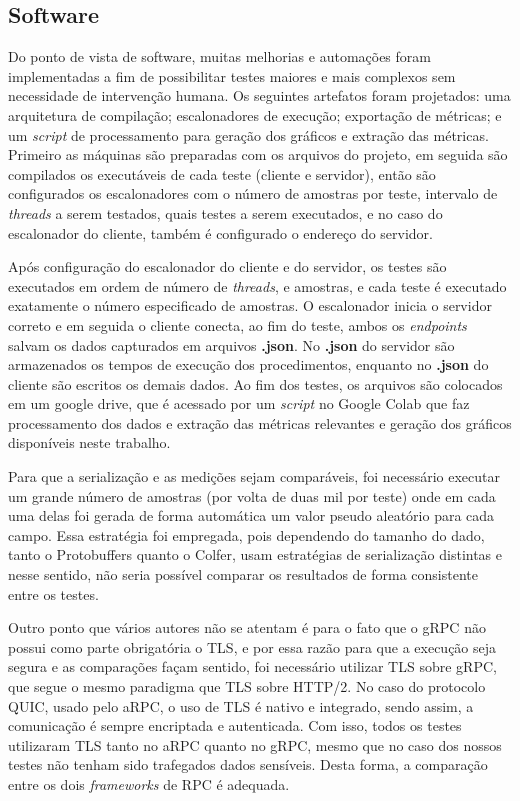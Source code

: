 \subsection{Software}
\label{sec:infraestrutura_execucao_software}

Do ponto de vista de software, muitas melhorias e automações foram implementadas a fim de possibilitar testes maiores e mais complexos sem necessidade de intervenção humana. Os seguintes artefatos foram projetados: uma arquitetura de compilação; escalonadores de execução; exportação de métricas; e um \textit{script} de processamento para geração dos gráficos e extração das métricas. Primeiro as máquinas são preparadas com os arquivos do projeto, em seguida são compilados os executáveis de cada teste (cliente e servidor), então são configurados os escalonadores com o número de amostras por teste, intervalo de \textit{threads} a serem testados, quais testes a serem executados, e no caso do escalonador do cliente, também é configurado o endereço do servidor. 

Após configuração do escalonador do cliente e do servidor, os testes são executados em ordem de número de \textit{threads}, e amostras, e cada teste é executado exatamente o número especificado de amostras. O escalonador inicia o servidor correto e em seguida o cliente conecta, ao fim do teste, ambos os \textit{endpoints} salvam os dados capturados em arquivos \textbf{.json}. No \textbf{.json} do servidor são armazenados os tempos de execução dos procedimentos, enquanto no \textbf{.json} do cliente são escritos os demais dados. Ao fim dos testes, os arquivos são colocados em um google drive, que é acessado por um \textit{script} no Google Colab que faz processamento dos dados e extração das métricas relevantes e geração dos gráficos disponíveis neste trabalho.

Para que a serialização e as medições sejam comparáveis, foi necessário executar um grande número de amostras (por volta de duas mil por teste) onde em cada uma delas foi gerada de forma automática um valor pseudo aleatório para cada campo. Essa estratégia foi empregada, pois dependendo do tamanho do dado, tanto o Protobuffers quanto o Colfer, usam estratégias de serialização distintas e nesse sentido, não seria possível comparar os resultados de forma consistente entre os testes.

Outro ponto que vários autores não se atentam é para o fato que o gRPC não possui como parte obrigatória o TLS, e por essa razão para que a execução seja segura e as comparações façam sentido, foi necessário utilizar TLS sobre gRPC, que segue o mesmo paradigma que TLS sobre HTTP/2. No caso do protocolo QUIC, usado pelo aRPC, o uso de TLS é nativo e integrado, sendo assim, a comunicação é sempre encriptada e autenticada. Com isso, todos os testes utilizaram TLS tanto no aRPC quanto no gRPC, mesmo que no caso dos nossos testes não tenham sido trafegados dados sensíveis. Desta forma, a comparação entre os dois \textit{frameworks} de RPC é adequada.

